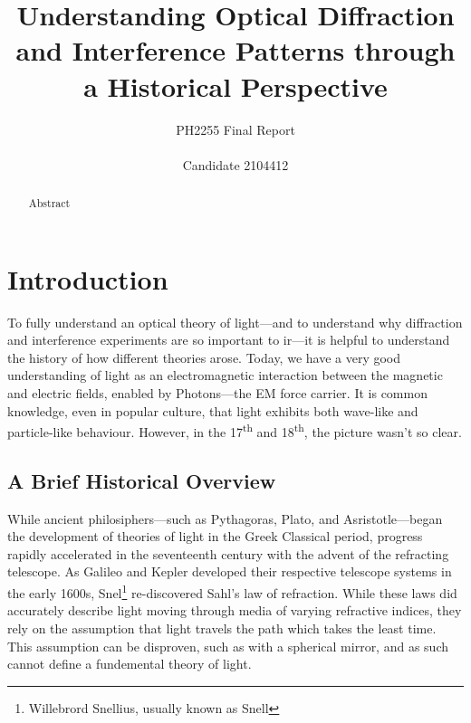 \documentclass[a4paper]{article}
\title{%
  Understanding Optical Diffraction and Interference Patterns through a Historical Perspective}
\author{PH2255 Final Report\\ \\Candidate 2104412}
\begin{document}
\maketitle

\begin{abstract}
Abstract
\end{abstract}

\tableofcontents
\newpage
\section{Introduction} \label{sec:intro}
To fully understand an optical theory of light---and to understand why diffraction and interference experiments are so important to ir---it is helpful to understand the history of how different theories arose. Today, we have a very good understanding of light as an electromagnetic interaction between the magnetic and electric fields, enabled by Photons---the EM force carrier. It is common knowledge, even in popular culture, that light exhibits both wave-like and particle-like behaviour. However, in the 17\textsuperscript{th} and 18\textsuperscript{th}, the picture wasn't so clear.\cite[\S1.3]{RefWorks:doc:60689ea38f08cf86c9dc700e}

\subsection{A Brief Historical Overview} \label{sub:over}

While ancient philosiphers---such as Pythagoras, Plato, and Asristotle---began the development of theories of light in the Greek Classical period, progress rapidly accelerated in the seventeenth century with the advent of the refracting telescope. As Galileo and Kepler developed their respective telescope systems in the early 1600s, Snel\footnote{Willebrord Snellius, usually known as Snell} re-discovered Sahl's law of refraction. While these laws did accurately describe light moving through media of varying refractive indices, they rely on the assumption that light travels the path which takes the least time. This assumption can be disproven, such as with a spherical mirror, and as such cannot define a fundemental theory of light.
\end{document}
